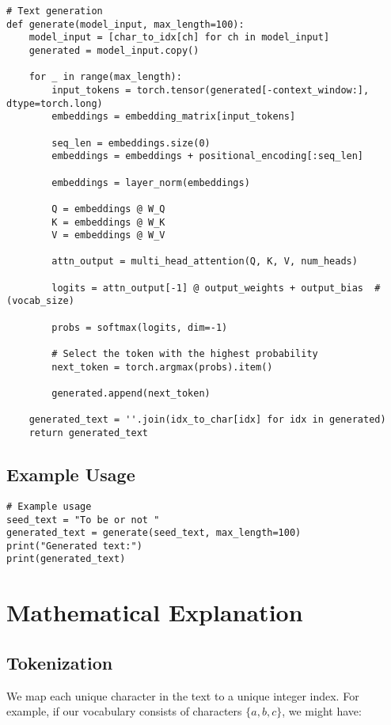 \documentclass{article}
\begin{document}
\begin{lstlisting}[style=pythonstyle]
# Text generation
def generate(model_input, max_length=100):
    model_input = [char_to_idx[ch] for ch in model_input]
    generated = model_input.copy()

    for _ in range(max_length):
        input_tokens = torch.tensor(generated[-context_window:], dtype=torch.long)
        embeddings = embedding_matrix[input_tokens]

        seq_len = embeddings.size(0)
        embeddings = embeddings + positional_encoding[:seq_len]

        embeddings = layer_norm(embeddings)

        Q = embeddings @ W_Q
        K = embeddings @ W_K
        V = embeddings @ W_V

        attn_output = multi_head_attention(Q, K, V, num_heads)

        logits = attn_output[-1] @ output_weights + output_bias  # (vocab_size)

        probs = softmax(logits, dim=-1)

        # Select the token with the highest probability
        next_token = torch.argmax(probs).item()

        generated.append(next_token)

    generated_text = ''.join(idx_to_char[idx] for idx in generated)
    return generated_text
\end{lstlisting}

\subsection{Example Usage}

\begin{lstlisting}[style=pythonstyle]
# Example usage
seed_text = "To be or not "
generated_text = generate(seed_text, max_length=100)
print("Generated text:")
print(generated_text)
\end{lstlisting}

\section{Mathematical Explanation}

\subsection{Tokenization}

We map each unique character in the text to a unique integer index. For example, if our vocabulary consists of characters \(\{ a, b, c \}\), we might have:
\end{document}
